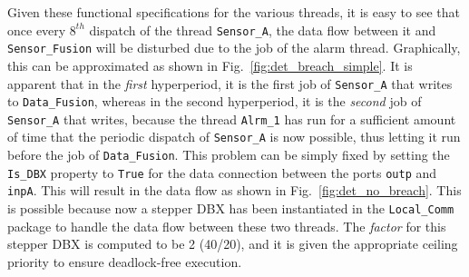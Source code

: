 Given these functional specifications for the various threads, it is
easy to see that once every $8^{th}$ dispatch of the thread
\texttt{Sensor\_A}, the data flow between it and
\texttt{Sensor\_Fusion} will be disturbed due to the job of the alarm
thread. Graphically, this can be approximated as shown in
Fig.~\ref{fig:det_breach_simple}. It is apparent that in the
\emph{first} hyperperiod, it is the first job of \texttt{Sensor\_A}
that writes to \texttt{Data\_Fusion}, whereas in the second
hyperperiod, it is the \emph{second} job of \texttt{Sensor\_A} that
writes, because the thread \texttt{Alrm\_1} has run for a sufficient
amount of time that the periodic dispatch of \texttt{Sensor\_A} is now
possible, thus letting it run before the job of
\texttt{Data\_Fusion}. This problem can be simply fixed by setting the
\texttt{Is\_DBX} property to \texttt{True} for the data connection
between the ports \texttt{outp} and \texttt{inpA}. This will result in
the data flow as shown in Fig.~\ref{fig:det_no_breach}. This is
possible because now a stepper DBX has been instantiated in the
\texttt{Local\_Comm} package to handle the data flow between these two
threads. The \emph{factor} for this stepper DBX is computed to be 2
(40/20), and it is given the appropriate ceiling priority to ensure
deadlock-free execution.

